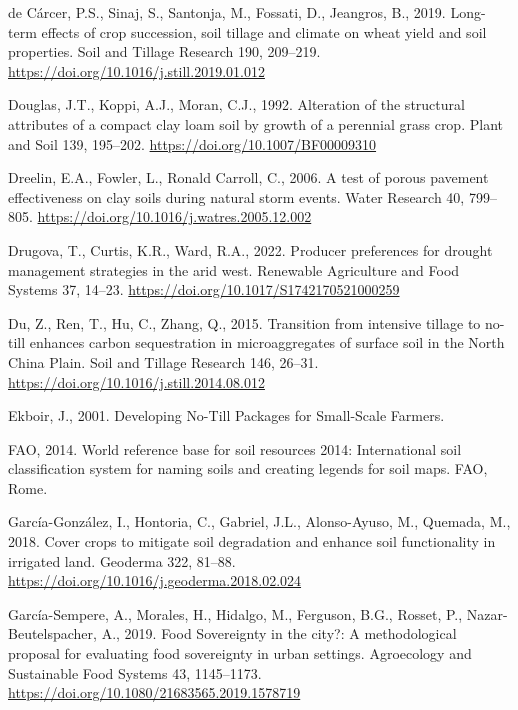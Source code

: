 \documentclass[
  12pt,
]{article}
\newlength{\cslhangindent}
\newlength{\cslentryspacingunit} %
\newenvironment{CSLReferences}[2] %
 {%
  \setlength{\parindent}{0pt}
  \ifodd #1
  \let\oldpar\par
  \def\par{\hangindent=\cslhangindent\oldpar}
  \fi
  \setlength{\parskip}{#2\cslentryspacingunit}
 }%
 {}
\begin{document}
\begin{CSLReferences}{1}{0}
\leavevmode{}%
de Cárcer, P.S., Sinaj, S., Santonja, M., Fossati, D., Jeangros, B., 2019. Long-term effects of crop succession, soil tillage and climate on wheat yield and soil properties. Soil and Tillage Research 190, 209--219. \url{https://doi.org/10.1016/j.still.2019.01.012}

\leavevmode{}%
Douglas, J.T., Koppi, A.J., Moran, C.J., 1992. Alteration of the structural attributes of a compact clay loam soil by growth of a perennial grass crop. Plant and Soil 139, 195--202. \url{https://doi.org/10.1007/BF00009310}

\leavevmode{}%
Dreelin, E.A., Fowler, L., Ronald Carroll, C., 2006. A test of porous pavement effectiveness on clay soils during natural storm events. Water Research 40, 799--805. \url{https://doi.org/10.1016/j.watres.2005.12.002}

\leavevmode{}%
Drugova, T., Curtis, K.R., Ward, R.A., 2022. Producer preferences for drought management strategies in the arid west. Renewable Agriculture and Food Systems 37, 14--23. \url{https://doi.org/10.1017/S1742170521000259}

\leavevmode{}%
Du, Z., Ren, T., Hu, C., Zhang, Q., 2015. Transition from intensive tillage to no-till enhances carbon sequestration in microaggregates of surface soil in the {North China Plain}. Soil and Tillage Research 146, 26--31. \url{https://doi.org/10.1016/j.still.2014.08.012}

\leavevmode{}%
Ekboir, J., 2001. Developing {No-Till Packages} for {Small-Scale Farmers}.

\leavevmode{}%
FAO, 2014. World reference base for soil resources 2014: International soil classification system for naming soils and creating legends for soil maps. {FAO}, {Rome}.

\leavevmode{}%
García-González, I., Hontoria, C., Gabriel, J.L., Alonso-Ayuso, M., Quemada, M., 2018. Cover crops to mitigate soil degradation and enhance soil functionality in irrigated land. Geoderma 322, 81--88. \url{https://doi.org/10.1016/j.geoderma.2018.02.024}

\leavevmode{}%
García-Sempere, A., Morales, H., Hidalgo, M., Ferguson, B.G., Rosset, P., Nazar-Beutelspacher, A., 2019. Food {Sovereignty} in the city?: {A} methodological proposal for evaluating food sovereignty in urban settings. Agroecology and Sustainable Food Systems 43, 1145--1173. \url{https://doi.org/10.1080/21683565.2019.1578719}


\end{CSLReferences}
\end{document}

